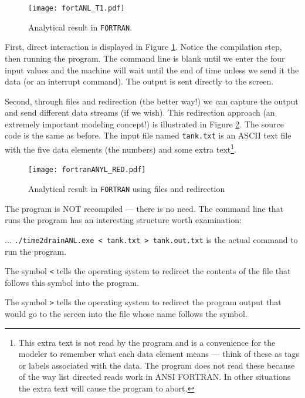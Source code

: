 \documentclass[12pt]{article}
\begin{document}
\begin{figure}[h!] %
   \centering
   \texttt{[image: fortANL\_T1.pdf]} 
   \caption{Analytical result in \texttt{FORTRAN}.}
   \label{fig:fortANL_T1.pdf}
\end{figure}

First, direct interaction is displayed in Figure \ref{fig:fortANL_T1.pdf}.  Notice the compilation step, then running the program.  The command line is blank until we enter the four input values and the machine will wait until the end of time unless we send it the data (or an interrupt command).  The output is sent directly to the screen.

Second, through files and redirection (the better way!) we can capture the output and send different data streams (if we wish).  This redirection approach (an extremely important modeling concept!) is illustrated in Figure \ref{fig:fortranANYL_RED.pdf}.  The source code is the same as before.  The input file named \texttt{tank.txt} is an ASCII text file with the five data elements (the numbers) and some extra text\footnote{This extra text is not read by the program and is a convenience for the modeler to remember what each data element means --- think of these as tags or labels associated with the data.  The program does not read these because of the way list directed reads work in ANSI FORTRAN.  In other situations the extra text will cause the program to abort.}.

\begin{figure}[h!] %
   \centering
   \texttt{[image: fortranANYL\_RED.pdf]} 
   \caption{Analytical result in \texttt{FORTRAN} using files and redirection}
   \label{fig:fortranANYL_RED.pdf}
\end{figure}

The program is NOT recompiled --- there is no need.  The command line that runs the program has an interesting structure worth examination:

$\dots$ \texttt{./time2drainANL.exe < tank.txt > tank.out.txt}  is the actual command to run the program.  

The symbol \texttt{<} tells the operating system to redirect the contents of the file that follows this symbol into the program.  

The symbol \texttt{>} tells the operating system to redirect the program output that would go to the screen into the file whose name follows the symbol.  
\end{document}
